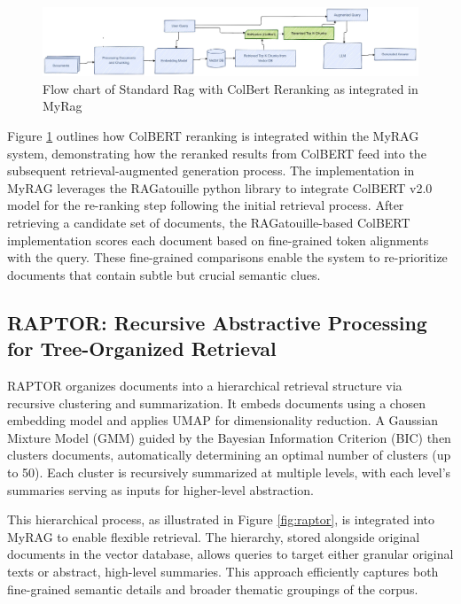 \documentclass[pdflatex,sn-mathphys-num]{sn-jnl}%
\theoremstyle{thmstyleone}%
\theoremstyle{thmstyletwo}%
\theoremstyle{thmstylethree}%
\begin{document}
\begin{figure}[h]
	\centering
	\includegraphics[width=\linewidth]{StandardRagWithReRanking.pdf}
	\caption{Flow chart of Standard Rag with ColBert Reranking as integrated in MyRag}
	\label{fig:reranking_rag}
\end{figure}

Figure \ref{fig:reranking_rag} outlines how ColBERT reranking is integrated within the MyRAG system, demonstrating how the reranked results from ColBERT feed into the subsequent retrieval-augmented generation process. The implementation in MyRAG leverages the RAGatouille python library to integrate ColBERT v2.0 model for the re-ranking step following the initial retrieval process. After retrieving a candidate set of documents, the RAGatouille-based ColBERT implementation scores each document based on fine-grained token alignments with the query. These fine-grained comparisons enable the system to re-prioritize documents that contain subtle but crucial semantic clues.


\subsection{RAPTOR: Recursive Abstractive Processing for Tree-Organized Retrieval} \label{subsec3.6}
RAPTOR \cite{wu2021recursively, raptor2024} organizes documents into a hierarchical retrieval structure via recursive clustering and summarization. It embeds documents using a chosen embedding model and applies UMAP for dimensionality reduction. A Gaussian Mixture Model (GMM) guided by the Bayesian Information Criterion (BIC) then clusters documents, automatically determining an optimal number of clusters (up to 50). Each cluster is recursively summarized at multiple levels, with each level’s summaries serving as inputs for higher-level abstraction. 

This hierarchical process, as illustrated in Figure \ref{fig:raptor}, is integrated into MyRAG to enable flexible retrieval. The hierarchy, stored alongside original documents in the vector database, allows queries to target either granular original texts or abstract, high-level summaries. This approach efficiently captures both fine-grained semantic details and broader thematic groupings of the corpus.
\end{document}
